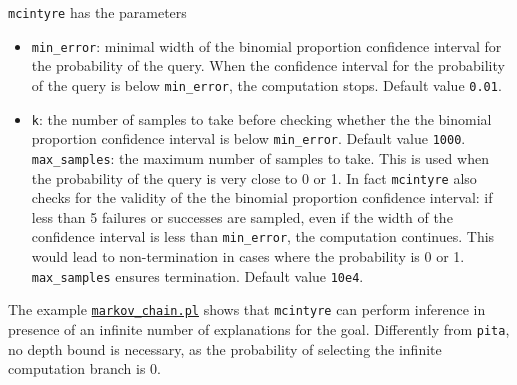 \verb|mcintyre| has the parameters
\begin{itemize}
\item \verb|min_error|: minimal width of the binomial proportion confidence interval for the probability of the query. When the confidence interval for the probability of the query is below \verb|min_error|, 
the computation stops.
 Default value \verb|0.01|.
\item 
\verb|k|:  the number of samples to take before checking whether the the binomial proportion confidence interval is below \verb|min_error|.
Default value \verb|1000|.
\verb|max_samples|: the maximum number of samples to take. This is used when the probability of the
query is very close to 0 or 1. In fact \verb|mcintyre| also checks for the validity of the
the binomial proportion confidence interval: if less than 5 failures or successes are sampled,
even if the width of the confidence interval is less than \verb|min_error|, the computation continues.
This would lead to non-termination in cases where the probability is 0 or 1. 
\verb|max_samples| ensures termination.
 Default value \verb|10e4|.
\end{itemize}
The example \href{http://cplint.lamping.unife.it/example/inference/markov_chain.pl}{\texttt{markov\_chain.pl}}
shows that \verb|mcintyre| can perform inference in presence of an infinite number of explanations for 
the goal. Differently from \verb|pita|, no depth bound is necessary, as the probability of selecting
the infinite computation branch is 0.